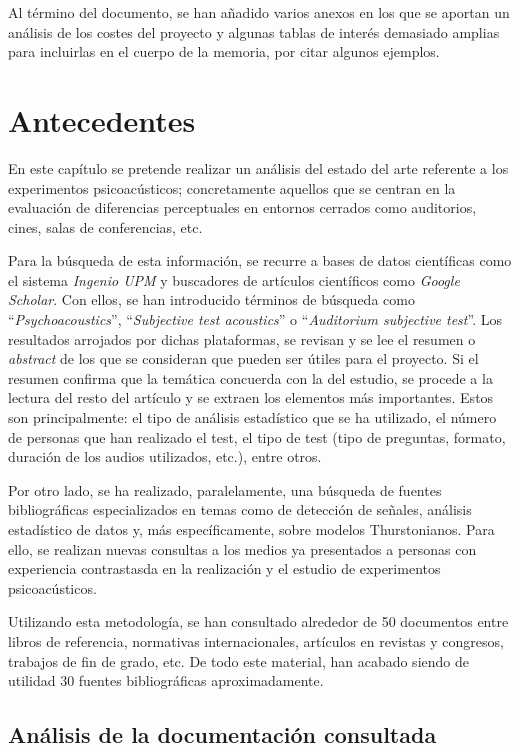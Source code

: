 \documentclass[11pt,a4paper]{book}
\begin{document}
        Al término del documento, se han añadido varios anexos en los que se aportan un análisis de los costes del proyecto y algunas tablas de interés demasiado amplias para incluirlas en el cuerpo de la memoria, por citar algunos ejemplos.

\chapter{Antecedentes}
    En este capítulo se pretende realizar un análisis del estado del arte referente a los experimentos psicoacústicos; concretamente aquellos que se centran en la evaluación de diferencias perceptuales en entornos cerrados como auditorios, cines, salas de conferencias, etc.
    
    Para la búsqueda de esta información, se recurre a bases de datos científicas como el sistema \textit{Ingenio UPM} y buscadores de artículos científicos como \textit{Google Scholar}. Con ellos, se han introducido términos de búsqueda como ``\textit{Psychoacoustics}'', ``\textit{Subjective test acoustics}'' o ``\textit{Auditorium subjective test}''. Los resultados arrojados por dichas plataformas, se revisan y se lee el resumen o \textit{abstract} de los que se consideran que pueden ser útiles para el proyecto. Si el resumen confirma que la temática concuerda con la del estudio, se procede a la lectura del resto del artículo y se extraen los elementos más importantes. Estos son principalmente: el tipo de análisis estadístico que se ha utilizado, el número de personas que han realizado el test, el tipo de test (tipo de preguntas, formato, duración de los audios utilizados, etc.), entre otros.
    
    Por otro lado, se ha realizado, paralelamente, una búsqueda de fuentes bibliográficas especializados en temas como de detección de señales, análisis estadístico de datos y, más específicamente, sobre modelos Thurstonianos. Para ello, se realizan nuevas consultas a los medios ya presentados a personas con experiencia contrastasda en la realización y el estudio de experimentos psicoacústicos.\newline
    
    Utilizando esta metodología, se han consultado alrededor de 50 documentos entre libros de referencia, normativas internacionales, artículos en revistas y congresos, trabajos de fin de grado, etc. De todo este material, han acabado siendo de utilidad 30 fuentes bibliográficas aproximadamente.
    
    \section{Análisis de la documentación consultada}
    
\end{document}
